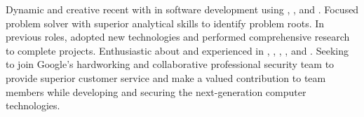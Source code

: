 

\begin{cvparagraph}

Dynamic and creative recent  with  in software development using , ,  and . Focused problem solver with superior analytical skills to identify problem roots. In previous roles, adopted new technologies and performed comprehensive research to complete projects. Enthusiastic about and experienced in , , , ,  and . Seeking to join Google's hardworking and collaborative professional security team to provide superior customer service and make a valued contribution to team members  while developing and securing the next-generation computer technologies.
\end{cvparagraph}
